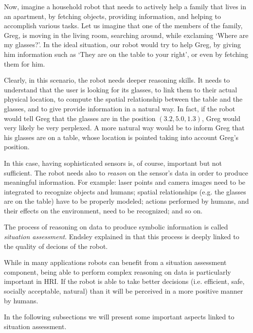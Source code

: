 
Now, imagine a household robot that needs to actively help a family that lives in an apartment, by fetching objects, providing information, and helping to accomplish various tasks. Let us imagine that one of the members of the family, Greg, is moving in the living room, searching around, while exclaming `Where are my glasses?'. In the ideal situation, our robot would try to help Greg, by giving him information such as `They are on the table to your right', or even by fetching them for him. 

Clearly, in this scenario, the robot needs deeper reasoning skills. It needs to understand that the user is looking for its glasses, to link them to their actual physical location, to compute the spatial relationship between the table and the glasses, and to give provide information in a natural way. In fact, if the robot would tell Greg that the glasses are in the position $(3.2, 5.0 , 1.3)$, Greg would very likely be very perplexed. A more natural way would be to inform Greg that his glasses are on a table, whose location is pointed taking into account Greg's position.

In this case, having sophisticated sensors is, of course, important but not sufficient. The robot needs also to \textit{reason} on the sensor's data in order to produce meaningful information. For example: laser points and camera images need to be integrated to recognize objects and humans; spatial relationships  (e.g. the glasses are on the table) have to be properly modeled; actions performed by humans, and their effects on the environment, need to be recognized; and so on. 

The process of reasoning on data to produce symbolic information is called \textit{situation assessment}. Endsley explained in \cite{endsley1995toward} that this process is deeply linked to the quality of  decions of the robot.

While in many applications robots can benefit from a situation assessment component, being able to perform complex reasoning on data is particularly important in HRI. If the robot is able to take better decisions (i.e.  efficient, safe, socially acceptable, natural) than it will be perceived in a more positive manner by humans. 

In the following subsections we will present some important aspects linked to situation assessment.


